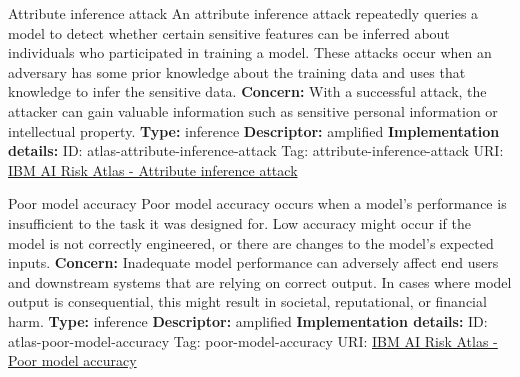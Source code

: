 \documentclass[a4paper,12pt]{article}
\begin{document}
\begin{definitionbox}{Attribute inference attack}
An attribute inference attack repeatedly queries a model to detect whether certain sensitive features can be inferred about individuals who participated in training a model. These attacks occur when an adversary has some prior knowledge about the training data and uses that knowledge to infer the sensitive data.\newline\newline
\textbf{Concern: }With a successful attack, the attacker can gain valuable information such as sensitive personal information or intellectual property.\newline\newline
\textbf{Type: }inference\newline
\textbf{Descriptor: }amplified \newline\newline
\textbf{Implementation details: } \newline
ID: atlas-attribute-inference-attack \newline
Tag: attribute-inference-attack \newline
URI:  \href{https://www.ibm.com/docs/en/watsonx/saas?topic=SSYOK8/wsj/ai-risk-atlas/attribute-inference-attack.html}{IBM AI Risk Atlas - Attribute inference attack}\newline
\end{definitionbox}
\begin{definitionbox}{Poor model accuracy}
Poor model accuracy occurs when a model's performance is insufficient to the task it was designed for. Low accuracy might occur if the model is not correctly engineered, or there are changes to the model's expected inputs.\newline\newline
\textbf{Concern: }Inadequate model performance can adversely affect end users and downstream systems that are relying on correct output. In cases where model output is consequential, this might result in societal, reputational, or financial harm.\newline\newline
\textbf{Type: }inference\newline
\textbf{Descriptor: }amplified \newline\newline
\textbf{Implementation details: } \newline
ID: atlas-poor-model-accuracy \newline
Tag: poor-model-accuracy \newline
URI:  \href{https://www.ibm.com/docs/en/watsonx/saas?topic=SSYOK8/wsj/ai-risk-atlas/poor-model-accuracy.html}{IBM AI Risk Atlas - Poor model accuracy}\newline
\end{definitionbox}
\end{document}
